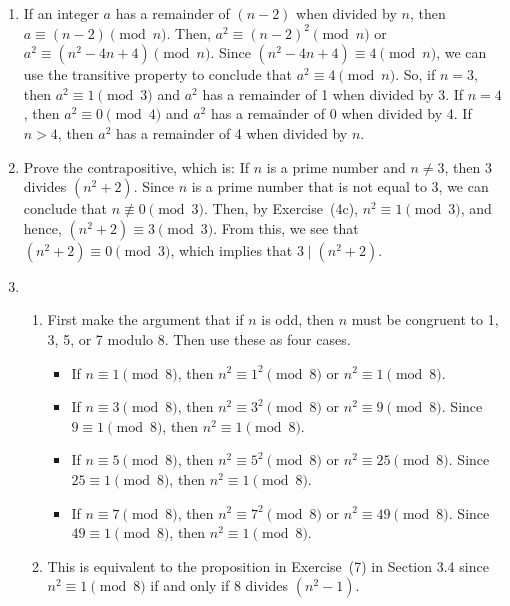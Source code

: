 \begin{enumerate}
\item If an integer $a$ has a remainder of $(n - 2)$ when divided by $n$, then 
$a \equiv (n - 2) \pmod n$.  Then, $a^2 \equiv (n - 2)^2 \pmod n$ or 
$a^2 \equiv (n^2 - 4n + 4) \pmod n$.  Since $(n^2 - 4n + 4) \equiv 4 \pmod n$, we can use the transitive property to conclude that $a^2 \equiv 4 \pmod n$.  So, if $n = 3$, then 
$a^2 \equiv 1 \pmod 3$ and $a^2$ has a remainder of 1 when divided by 3.  If $n = 4$, then 
$a^2 \equiv 0 \pmod 4$ and $a^2$ has a remainder of 0 when divided by 4.  If $n > 4$, then $a^2$ has a remainder of 4 when divided by $n$.


\item Prove the contrapositive, which is:  If $n$ is a prime number and $n \ne 3$, then 
$3$ divides $\left( n^2 + 2 \right)$.  Since $n$ is a prime number that is not equal to 3, we can conclude that $n \not\equiv 0 \pmod 3$.  Then, by Exercise~(4c), $n^2 \equiv 1 \pmod 3$, and hence, $\left( n^2 + 2 \right) \equiv 3 \pmod 3$.  From this, we see that 
$\left( n^2 + 2 \right) \equiv 0 \pmod 3$, which implies that $3 \mid \left( n^2 + 2 \right)$.



\item \begin{enumerate}
\item First make the argument that if $n$ is odd, then $n$  must be congruent to 1, 3, 5, or 7 modulo 8.  Then use these as four cases.
\begin{itemize}
\item If $n \equiv 1 \pmod 8$, then $n^2 \equiv 1^2 \pmod 8$ or $n^2 \equiv 1 \pmod 8$.

\item If $n \equiv 3 \pmod 8$, then $n^2 \equiv 3^2 \pmod 8$ or $n^2 \equiv 9 \pmod 8$.  
Since $9 \equiv 1 \pmod 8$, then $n^2 \equiv 1 \pmod 8$.

\item If $n \equiv 5 \pmod 8$, then $n^2 \equiv 5^2 \pmod 8$ or $n^2 \equiv 25 \pmod 8$.  
Since $25 \equiv 1 \pmod 8$, then $n^2 \equiv 1 \pmod 8$.

\item If $n \equiv 7 \pmod 8$, then $n^2 \equiv 7^2 \pmod 8$ or $n^2 \equiv 49 \pmod 8$.  
Since $49 \equiv 1 \pmod 8$, then $n^2 \equiv 1 \pmod 8$.
\end{itemize}

\item This is equivalent to the proposition in Exercise~(7) in Section 3.4 since 
$n^2 \equiv 1 \pmod 8$ if and only if 8 divides $(n^2 - 1)$.


\end{enumerate}
\end{enumerate}
